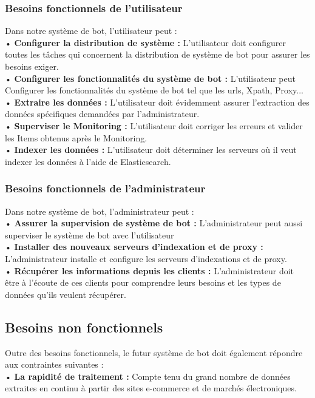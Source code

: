 \subsubsection{Besoins fonctionnels de l'utilisateur }
Dans notre système de bot, l'utilisateur peut :\\
•	\textbf{Configurer la distribution de système :} L'utilisateur doit configurer  toutes les tâches qui concernent la distribution de système de bot pour assurer les besoins exiger.\\
•	\textbf{Configurer les fonctionnalités du système de bot :} L'utilisateur peut Configurer les fonctionnalités du système de bot tel que les urls, Xpath, Proxy... \\
•	\textbf{Extraire les données :} L'utilisateur doit évidemment assurer l'extraction des données spécifiques demandées par l'administrateur.\\
•	\textbf{Superviser le Monitoring :} L'utilisateur doit corriger les erreurs et valider les Items obtenus après le Monitoring.\\
•	\textbf{Indexer les données :} L'utilisateur doit déterminer les serveurs où il veut indexer les données à l'aide de Elasticsearch.\\
\subsubsection{Besoins fonctionnels de l'administrateur }
Dans notre système de bot, l'administrateur peut :\\
•	\textbf{Assurer la supervision de système de bot :} L'administrateur peut aussi superviser le système de bot avec l'utilisateur \\
•	\textbf{Installer des nouveaux serveurs d’indexation et de proxy :} L'administrateur installe et configure les serveurs d'indexations et de proxy.\\
•	\textbf{Récupérer les informations depuis les clients  :} L'administrateur doit être à l'écoute de ces clients pour comprendre leurs besoins et les types de données qu'ils veulent récupérer. 
\newpage
\subsection{Besoins non fonctionnels}
Outre des besoins fonctionnels, le futur système de bot doit également répondre aux contraintes suivantes :\\
	\indent•	\textbf{La rapidité de traitement :} Compte tenu du grand nombre de données extraites en continu à partir des sites e-commerce et de marchés électroniques.\\
	

